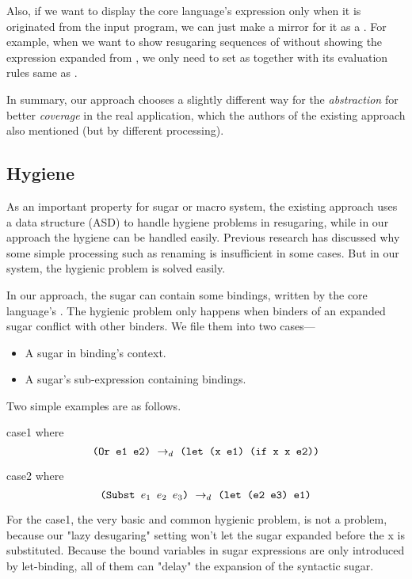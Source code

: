 Also, if we want to display the core language's expression only when it is originated from the input program, we can just make a mirror for it as a . For example, when we want to show resugaring sequences of 
without showing the  expression expanded from , we only need to set  as  together with its evaluation rules same as .

In summary, our approach chooses a slightly different way for the \emph{abstraction} for better \emph{coverage} in the real application, which the authors of the existing approach also mentioned (but by different processing).


\subsection{Hygiene}
\label{mark:hygiene}

As an important property for sugar or macro system, the existing approach uses a data structure (ASD) to handle hygiene problems in resugaring, while in our approach the hygiene can be handled easily. Previous research\cite{EssenceofHygiene} has discussed why some simple processing such as renaming is insufficient in some cases. But in our system, the hygienic problem is solved easily.

In our approach, the sugar can contain some bindings, written by the core language's . The hygienic problem only happens when binders of an expanded sugar conflict with other binders. We file them into two cases---
\begin{itemize}
\item A sugar in binding's context.
\item A sugar's sub-expression containing bindings.
\end{itemize}
Two simple examples are as follows.

\begin{center}
	\hfill case1 {\scriptsize{where \[\texttt{(Or~e1~e2)} ~\rightarrow_d~ \texttt{(let (x e1) (if x x e2))}\]}}

 \hfill case2{
\scriptsize{
where \[
\texttt{(Subst $e_1$ $e_2$ $e_3$)} ~\rightarrow_d~ \texttt{(let (e2 e3) e1)}
\]}}
\end{center}



For the case1, the very basic and common hygienic problem, is not a problem, because our "lazy desugaring" setting won't let the sugar  expanded before the x is substituted. Because the bound variables in sugar expressions are only introduced by let-binding, all of them can "delay" the expansion of the syntactic sugar.


